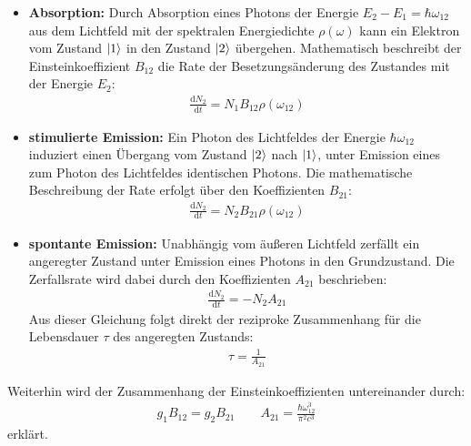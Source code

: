 \documentclass[11pt, a4paper]{article}
\numberwithin{equation}{section}
\begin{document}
\begin{itemize}
	\item \textbf{Absorption:} Durch Absorption eines Photons der Energie $E_2 - E_1 = \hbar \omega_{12}$ aus dem Lichtfeld mit der spektralen Energiedichte $\rho(\omega)$ kann ein Elektron vom Zustand $\ket{1}$ in den Zustand $\ket{2}$ übergehen.
	Mathematisch beschreibt der Einsteinkoeffizient $B_{12}$ die Rate der Besetzungsänderung des Zustandes mit der Energie $E_2$:
	\begin{align}
		\frac{\mathrm{d} N_2}{\mathrm{d} t} = N_1 B_{12} \rho\left( \omega_{12} \right)
	\end{align}
	
	\item \textbf{stimulierte Emission:} Ein Photon des Lichtfeldes der Energie $\hbar \omega_{12}$ induziert einen Übergang vom Zustand $\ket{2}$ nach $\ket{1}$, unter Emission eines zum Photon des Lichtfeldes identischen Photons.
	Die mathematische Beschreibung der Rate erfolgt über den Koeffizienten $B_{21}$:
	\begin{align}
		\frac{\mathrm{d} N_2}{\mathrm{d} t} = N_2 B_{21} \rho\left( \omega_{12} \right)
	\end{align}
	
	\item \textbf{spontante Emission:}
	Unabhängig vom äußeren Lichtfeld zerfällt ein angeregter Zustand unter Emission eines Photons in den Grundzustand.
	Die Zerfallsrate wird dabei durch den Koeffizienten $A_{21}$ beschrieben:
	\begin{align}
		\frac{\mathrm{d} N_2}{\mathrm{d} t} = - N_2 A_{21}
	\end{align}
	Aus dieser Gleichung folgt direkt der reziproke Zusammenhang für die Lebensdauer $\tau$ des angeregten Zustands:
	\begin{align}
		\tau = \frac{1}{A_{21}}
	\end{align}
\end{itemize}
Weiterhin wird der Zusammenhang der Einsteinkoeffizienten untereinander durch:
\begin{align}
	g_1 B_{12} = g_2 B_{21}  \qquad A_{21} = \frac{\hbar \omega_{12}^3}{\pi^2 c^3}
\end{align}
erklärt.
\end{document}
